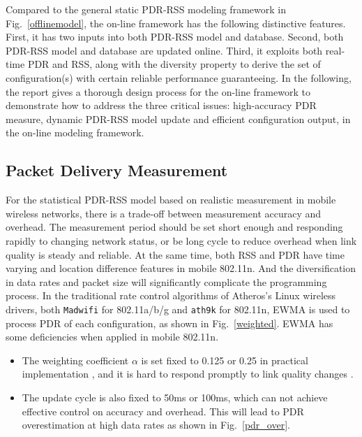 \documentclass[draftclsnofoot,journal,onecolumn,11pt]{IEEEtran}
\begin{document}
Compared to the general static PDR-RSS modeling framework in Fig.~\ref{offlinemodel}, the on-line framework has the following distinctive features. First, it has two inputs into both PDR-RSS model and database. Second, both PDR-RSS model and database are updated online. Third, it exploits both real-time PDR and RSS, along with the diversity property to derive the set of configuration(s) with certain reliable performance guaranteeing. In the following, the report gives a thorough design process for the on-line framework to demonstrate how to address the three critical issues: high-accuracy PDR measure, dynamic PDR-RSS model update and efficient configuration output, in the on-line modeling framework.

\subsection{Packet Delivery Measurement} \label{sect:methodology}
For the statistical PDR-RSS model based on realistic measurement in mobile wireless networks, there is a trade-off between measurement accuracy and overhead. The measurement period should be set short enough and responding rapidly to changing network status, or be long cycle to reduce overhead when link quality is steady and reliable. At the same time, both RSS and PDR have time varying and location difference features in mobile 802.11n. And the diversification in data rates and packet size will significantly complicate the programming process. In the traditional rate control algorithms of Atheros's Linux wireless drivers, both \texttt{Madwifi} for 802.11a/b/g and \texttt{ath9k} \cite{ath9k} for 802.11n, EWMA is used to process PDR of each configuration, as shown in Fig.~\ref{weighted}. EWMA has some deficiencies when applied in mobile 802.11n.

\begin{itemize}
  \item The weighting coefficient $\alpha$ is set fixed to 0.125 or 0.25 in practical implementation \cite{ath9k} \cite{minstrel}, and it is hard to respond promptly to link quality changes \cite{EWMAChart}.
  \item The update cycle is also fixed to 50ms or 100ms, which can not achieve effective control on accuracy and overhead. This will lead to PDR overestimation at high data rates as shown in Fig.~\ref{pdr_over}.
\end{itemize}
\end{document}
